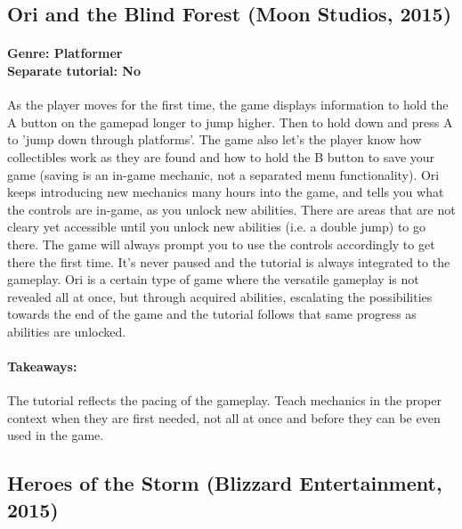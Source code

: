 \subsection{Ori and the Blind Forest (Moon Studios, 2015)}
\paragraph{Genre: Platformer \\ Separate tutorial: No \\}
As the player moves for the first time, the game displays information to hold the A button on the gamepad longer to jump higher.
Then to hold down and press A to 'jump down through platforms'.
The game also let's the player know how collectibles work as they are found and how to hold the B button  to save your game (saving is an in-game mechanic, not a separated menu functionality).
Ori keeps introducing new mechanics many hours into the game, and tells you what the controls are in-game, as you unlock new abilities.
There are areas that are not cleary yet accessible until you unlock new abilities (i.e. a double jump) to go there. The game will always prompt you to use the controls accordingly to get there the first time. It's never paused and the tutorial is always integrated to the gameplay.
Ori is a certain type of game where the versatile gameplay is not revealed all at once, but through acquired abilities, escalating the possibilities towards the end of the game and the tutorial follows that same progress as abilities are unlocked.
\paragraph{Takeaways:}
The tutorial reflects the pacing of the gameplay. Teach mechanics in the proper context when they are first needed, not all at once and before they can be even used in the game.

\subsection{Heroes of the Storm (Blizzard Entertainment, 2015)}

